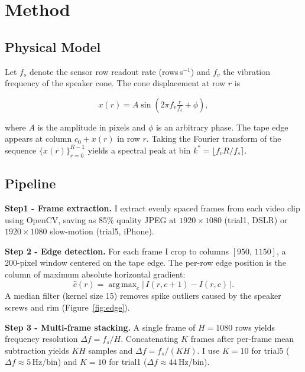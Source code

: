 \documentclass[10pt,twocolumn,letterpaper]{article}
\DeclareMathOperator*{\argmax}{arg\,max}
\begin{document}
\section{Method}
\label{sec:method}

\subsection{Physical Model}

Let $f_s$ denote the sensor row readout rate (rows\,s$^{-1}$) and $f_v$ the vibration frequency of the speaker cone. The cone displacement at row $r$ is

\begin{equation}
  x(r) = A\sin\!\left(2\pi f_v \tfrac{r}{f_s} + \phi\right),
  \label{eq:model}
\end{equation}

where $A$ is the amplitude in pixels and $\phi$ is an arbitrary phase. The tape edge appears at column $c_0 + x(r)$ in row $r$. Taking the Fourier transform of the sequence $\{x(r)\}_{r=0}^{R-1}$ yields a spectral peak at bin $k^* = \lfloor f_v R / f_s \rceil$.

\subsection{Pipeline}

\textbf{Step1 - Frame extraction.}
I extract evenly spaced frames from each video clip using OpenCV, saving as 85\% quality JPEG at $1920\times1080$ (trial1, DSLR) or $1920\times1080$ slow-motion (trial5, iPhone).

\textbf{Step 2 - Edge detection.}
For each frame I crop to columns $[950,\,1150]$, a 200-pixel window centered on the tape edge. The per-row edge position is the column of maximum absolute horizontal gradient:
\begin{equation}
  \hat{c}(r) = \argmax_{c}
    \bigl|\,I(r,c+1) - I(r,c)\,\bigr|.
  \label{eq:edge}
\end{equation}
A median filter (kernel size 15) removes spike outliers caused by the speaker screws and rim (Figure~\ref{fig:edge}).

\textbf{Step 3 - Multi-frame stacking.}
A single frame of $H=1080$ rows yields frequency resolution $\Delta f = f_s / H$. Concatenating $K$ frames after per-frame mean subtraction yields $K\!H$ samples and $\Delta f = f_s / (KH)$. I use $K=10$ for trial5 ($\Delta f \approx 5$\,Hz/bin) and $K=10$ for trial1 ($\Delta f \approx 44$\,Hz/bin).
\end{document}
